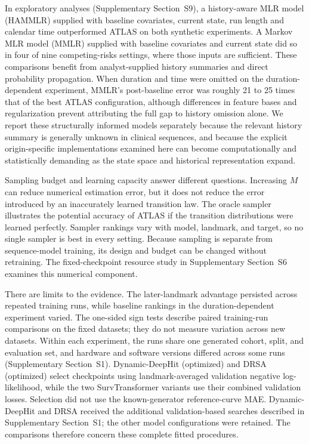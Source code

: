 In exploratory analyses (Supplementary Section~S9), a history-aware MLR model (HAMMLR) supplied with baseline covariates, current state, run length and calendar time outperformed ATLAS on both synthetic experiments. A Markov MLR model (MMLR) supplied with baseline covariates and current state did so in four of nine competing-risks settings, where those inputs are sufficient. These comparisons benefit from analyst-supplied history summaries and direct probability propagation. When duration and time were omitted on the duration-dependent experiment, MMLR's post-baseline error was roughly 21 to 25 times that of the best ATLAS configuration, although differences in feature bases and regularization prevent attributing the full gap to history omission alone. We report these structurally informed models separately because the relevant history summary is generally unknown in clinical sequences, and because the explicit origin-specific implementations examined here can become computationally and statistically demanding as the state space and historical representation expand.

Sampling budget and learning capacity answer different questions. Increasing $M$ can reduce numerical estimation error, but it does not reduce the error introduced by an inaccurately learned transition law. The oracle sampler illustrates the potential accuracy of ATLAS if the transition distributions were learned perfectly. Sampler rankings vary with model, landmark, and target, so no single sampler is best in every setting. Because sampling is separate from sequence-model training, its design and budget can be changed without retraining. The fixed-checkpoint resource study in Supplementary Section~S6 examines this numerical component.

There are limits to the evidence. The later-landmark advantage persisted across repeated training runs, while baseline rankings in the duration-dependent experiment varied. The one-sided sign tests describe paired training-run comparisons on the fixed datasets; they do not measure variation across new datasets. Within each experiment, the runs share one generated cohort, split, and evaluation set, and hardware and software versions differed across some runs (Supplementary Section~S1). Dynamic-DeepHit (optimized) and DRSA (optimized) select checkpoints using landmark-averaged validation negative log-likelihood, while the two SurvTransformer variants use their combined validation losses. Selection did not use the known-generator reference-curve MAE. Dynamic-DeepHit and DRSA received the additional validation-based searches described in Supplementary Section~S1; the other model configurations were retained. The comparisons therefore concern these complete fitted procedures.


